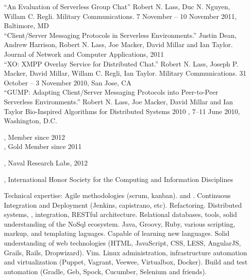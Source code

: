 \documentclass[10pt,a4paper]{article}
\begin{document}
\noindent ``An Evaluation of Serverless Group Chat'' Robert N. Lass, Duc N. Nguyen,  Willam C. Regli. Military Communications. 7 November -- 10 November 2011, Baltimore, MD \\

\noindent ``Client/Server Messaging Protocols in Serverless Environments.'' Justin Dean, Andrew Harrison, Robert N. Lass, Joe Macker, David Millar and Ian Taylor. Journal of Network and Computer Applications, 2011 \\

\noindent ``XO: XMPP Overlay Service for Distributed Chat.'' Robert N. Lass, Joseph P. Macker, David Millar, Willam C. Regli, Ian Taylor. Military Communications. 31 October -- 3 November 2010, San Jose, CA \\

\noindent ``GUMP: Adapting Client/Server Messaging Protocols into Peer-to-Peer Serverless Environments.'' Robert N. Lass, Joe Macker, David Millar and Ian Taylor Bio-Inspired Algorithms for Distributed Systems 2010 , 7--11 June 2010, Washington, D.C. \\

\vspace{0.5em}
\spacedhrule{0.5em}{-0.4em}



\noindent{}, Member since 2012 \\
\noindent{}, Gold Member since 2011 \\
\vspace{0.5em}
\spacedhrule{0.5em}{-0.4em}


, Naval Research Labs, 2012

\noindent{}, International Honor Society for the Computing and Information Disciplines
\vspace{0.5em}
\spacedhrule{0.5em}{-0.4em}


\inlineheadsection  %
  {Technical expertise:}
  {
    Agile methodologies (scrum, kanban).
     and .
    Continuous Integration and Deployment (Jenkins, capistrano, etc).
    Refactoring.
    Distributed systems, , integration, RESTful architecture.
    Relational databases,  tools, solid understanding of the NoSql ecosystem.
    Java, Groovy, Ruby, various scripting, markup, and templating laguages.  Capable of learning new languages.
    Solid understanding of web technologies (HTML, JavaScript, CSS, LESS, AngularJS, Grails, Rails, Dropwizard).
    Vim. Linux administration, infrastructure automation and virtualization (Puppet, Vagrant, Veewee, Virtualbox, Docker).
    Build and test automation (Gradle, Geb, Spock, Cucumber, Selenium and friends).
  }
\end{document}
